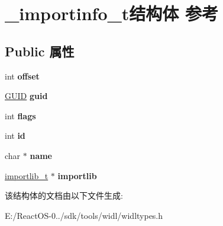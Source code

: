 \hypertarget{struct__importinfo__t}{}\section{\+\_\+importinfo\+\_\+t结构体 参考}
\label{struct__importinfo__t}
\subsection*{Public 属性}
\begin{DoxyCompactItemize}
\item 
\mbox{\label{struct__importinfo__t_ae2f61a524507797157cfb1ad381389ba}} 
int {\bfseries offset}
\item 
\mbox{\label{struct__importinfo__t_a76d06f3078590769447a9068df73cd3c}} 
\hyperlink{interface_g_u_i_d}{G\+U\+ID} {\bfseries guid}
\item 
\mbox{\label{struct__importinfo__t_a690f974b783a708a3082b88cac33165d}} 
int {\bfseries flags}
\item 
\mbox{\label{struct__importinfo__t_a7620caa522b0af972691e234ae6d2dfe}} 
int {\bfseries id}
\item 
\mbox{\label{struct__importinfo__t_a0b13983fc7b371f526a8d32ce339be41}} 
char $\ast$ {\bfseries name}
\item 
\mbox{\label{struct__importinfo__t_a5691466460bd73593387707e175bd1e2}} 
\hyperlink{struct__importlib__t}{importlib\+\_\+t} $\ast$ {\bfseries importlib}
\end{DoxyCompactItemize}


该结构体的文档由以下文件生成\+:\begin{DoxyCompactItemize}
\item 
E\+:/\+React\+O\+S-\/0../sdk/tools/widl/widltypes.\+h\end{DoxyCompactItemize}
